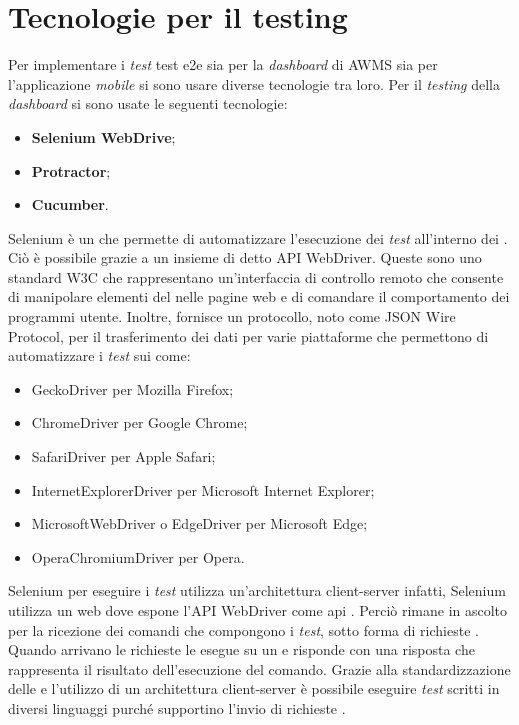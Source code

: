 \section{Tecnologie per il testing}
Per implementare i \emph{test} \gls{test e2e} sia per la \emph{dashboard} di \gls{AWMS} sia per l'applicazione \emph{mobile} si sono usare diverse tecnologie tra loro. Per il \emph{testing} della \emph{dashboard} si sono usate le seguenti tecnologie:
\begin{itemize}
	\item \textbf{Selenium WebDrive};
	\item \textbf{Protractor};
	\item \textbf{Cucumber}.
\end{itemize}
Selenium è un  che permette di automatizzare l'esecuzione dei \emph{test} all'interno dei . Ciò è possibile grazie a un insieme di  detto API WebDriver. Queste  sono uno standard \gls{W3C} che rappresentano un'interfaccia di controllo remoto che consente di manipolare elementi del  nelle pagine web e di comandare il comportamento dei programmi utente. Inoltre, fornisce un protocollo, noto come JSON Wire Protocol, per il trasferimento dei dati per varie piattaforme che permettono di automatizzare i \emph{test} sui  come:
\begin{itemize}
	\item GeckoDriver per Mozilla Firefox;
	\item ChromeDriver per Google Chrome;
	\item SafariDriver per Apple Safari;
	\item InternetExplorerDriver per Microsoft Internet Explorer;
	\item MicrosoftWebDriver o EdgeDriver per Microsoft Edge;
	\item OperaChromiumDriver per Opera.
\end{itemize}
Selenium per eseguire i \emph{test} utilizza un’architettura client-server infatti, Selenium utilizza un  web dove espone l'API WebDriver come \gls{api} . Perciò rimane in ascolto per la ricezione dei comandi che compongono i \emph{test}, sotto forma di richieste . Quando arrivano le richieste le esegue su un  e risponde con una risposta  che rappresenta il risultato dell'esecuzione del comando. Grazie alla standardizzazione delle  e l'utilizzo di un architettura client-server è possibile eseguire \emph{test} scritti in diversi linguaggi purché supportino l'invio di richieste .\\

